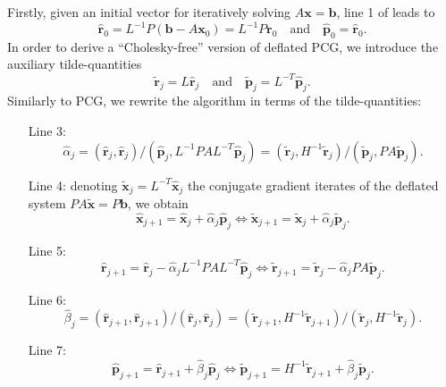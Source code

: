 \documentclass{article}
\numberwithin{equation}{section}
\theoremstyle{definition}
\begin{document}
\begin{appendices}
Firstly, given an initial vector for iteratively solving $A\bm{x}=\bm{b}$, line 1 of  leads to
\begin{equation*}
    \hat{\bm{r}}_0=L^{-1}P(\bm{b}-A\bm{x}_0) = L^{-1}P\bm{r}_0 \quad \text{and} \quad \hat{\bm{p}}_0=\hat{\bm{r}}_0.
\end{equation*}
In order to derive a ``Cholesky-free'' version of deflated PCG, we introduce the auxiliary tilde-quantities
\begin{equation*}
    \tilde{\bm{r}}_j = L\hat{\bm{r}}_j \quad \text{and} \quad \tilde{\bm{p}}_j = L^{-T}\hat{\bm{p}}_j.
\end{equation*}
Similarly to PCG, we rewrite the algorithm in terms of the tilde-quantities:
\begin{itemize}[leftmargin=*, align=left, labelwidth=!]
    \item[Line 3:]
    \begin{equation*}
        \hat{\alpha}_j = (\hat{\bm{r}}_j,\hat{\bm{r}}_j)/(\hat{\bm{p}}_j,L^{-1}PAL^{-T}\hat{\bm{p}}_j) = (\tilde{\bm{r}}_j,H^{-1}\tilde{\bm{r}}_j)/(\tilde{\bm{p}}_j,PA\tilde{\bm{p}}_j).
    \end{equation*}
    \item[Line 4:] denoting $\tilde{\bm{x}}_j=L^{-T}\hat{\bm{x}}_j$ the conjugate gradient iterates of the deflated system $PA\bm{\tilde{x}}=P\bm{b}$, we obtain
    \begin{equation*}
    \hat{\bm{x}}_{j+1}=\hat{\bm{x}}_j+\hat{\alpha}_j\hat{\bm{p}}_j \iff \tilde{\bm{x}}_{j+1}=\tilde{\bm{x}}_j+\hat{\alpha}_j\tilde{\bm{p}}_j.
    \end{equation*}
    \item[Line 5:] 
    \begin{equation*}
        \hat{\bm{r}}_{j+1}=\hat{\bm{r}}_j-\hat{\alpha}_jL^{-1}PAL^{-T}\hat{\bm{p}}_j \iff \tilde{\bm{r}}_{j+1}=\tilde{\bm{r}}_j-\hat{\alpha}_jPA\tilde{\bm{p}}_j.
    \end{equation*}
    \item[Line 6:]
    \begin{equation*}
        \hat{\beta}_j=(\hat{\bm{r}}_{j+1},\hat{\bm{r}}_{j+1})/(\hat{\bm{r}}_j,\hat{\bm{r}}_j)=(\tilde{\bm{r}}_{j+1},H^{-1}\tilde{\bm{r}}_{j+1})/(\tilde{\bm{r}}_j,H^{-1}\tilde{\bm{r}}_j).
    \end{equation*}
    \item[Line 7:]
    \begin{equation*}
        \hat{\bm{p}}_{j+1}=\hat{\bm{r}}_{j+1}+\hat{\beta}_j \hat{\bm{p}}_j \iff  \tilde{\bm{p}}_{j+1}=H^{-1}\tilde{\bm{r}}_{j+1}+\hat{\beta}_j\tilde{\bm{p}}_{j}.

\end{equation*}
\end{itemize}
\end{appendices}
\end{document}
